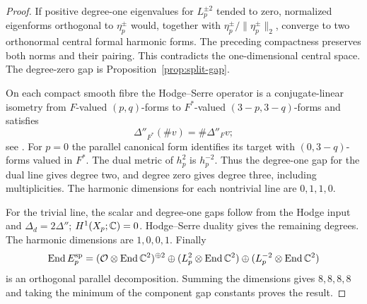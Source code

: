 \begin{proof}
If positive degree-one eigenvalues for $L_p^{\pm2}$ tended
to zero, normalized eigenforms orthogonal to
$\eta_p^\pm$ would, together with
$\eta_p^\pm/\|\eta_p^\pm\|_2$, converge to two orthonormal
central formal harmonic forms. The preceding compactness
preserves both norms and their pairing. This contradicts
the one-dimensional central space. The degree-zero gap is
Proposition~\ref{prop:split-gap}.

On each compact smooth fibre the Hodge--Serre operator is
a conjugate-linear isometry from $F$-valued $(p,q)$-forms
to $F^*$-valued $(3-p,3-q)$-forms and satisfies
\[
 \Delta''_{F^*}(\#v)=\#\Delta''_Fv;
\]
see \cite[Chapter VI, Section 3.1 and proof of Theorem 7.3]{Demailly}.
For $p=0$ the parallel canonical form identifies its target
with $(0,3-q)$-forms valued in $F^*$. The dual metric of
$h_p^2$ is $h_p^{-2}$. Thus the degree-one gap for the
dual line gives degree two, and degree zero gives degree
three, including multiplicities. The harmonic dimensions
for each nontrivial line are $0,1,1,0$.

For the trivial line, the scalar and degree-one gaps
follow from the Hodge input and $\Delta_d=2\Delta''$;
$H^1(X_p;\mathbb C)=0$. Hodge--Serre duality gives the remaining
degrees. The harmonic dimensions are $1,0,0,1$.
Finally
\[
 \operatorname{End} E^{\rm sp}_p
 =(\mathcal O\otimes\operatorname{End}\mathbb C^2)^{\oplus2}
 \oplus(L_p^2\otimes\operatorname{End}\mathbb C^2)
 \oplus(L_p^{-2}\otimes\operatorname{End}\mathbb C^2)
\]
is an orthogonal parallel decomposition. Summing the
dimensions gives $8,8,8,8$ and taking the minimum of the
component gap constants proves the result.
\end{proof}
